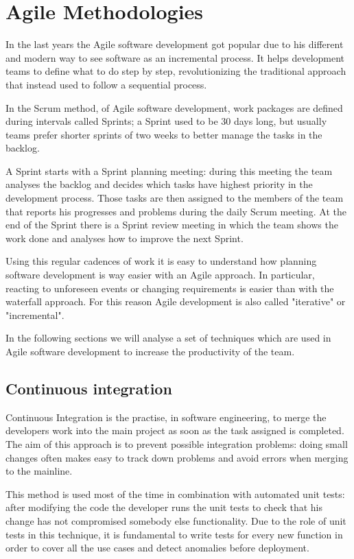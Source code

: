 \section{Agile Methodologies}

In the last years the Agile software development got popular due to his
different and modern way to see software as an incremental process. It
helps development teams to define what to do step by step, revolutionizing
the traditional approach that instead used to follow a sequential process.

In the Scrum method, of Agile software development, work packages are
defined during intervals called Sprints; a Sprint used to be 30 days long,
but usually teams prefer shorter sprints of two weeks to better manage the
tasks in the backlog.

A Sprint starts with a Sprint planning meeting: during this meeting the team
analyses the backlog and decides which tasks have highest priority in the
development process. Those tasks are then assigned to the members of the
team that reports his progresses and problems during the daily Scrum
meeting. At the end of the Sprint there is a Sprint review meeting in
which the team shows the work done and analyses how to improve the next
Sprint.

Using this regular cadences of work it is easy to understand how planning
software development is way easier with an Agile approach. In particular,
reacting to unforeseen events or changing requirements is easier than with
the waterfall approach. For this reason Agile development is also called
"iterative" or "incremental".

In the following sections we will analyse a set of techniques which are
used in Agile software development to increase the productivity of the
team.

\subsection{Continuous integration}

Continuous Integration is the practise, in software engineering, to merge
the developers work into the main project as soon as the task assigned is
completed. The aim of this approach is to prevent possible integration
problems: doing small changes often makes easy to track down problems and
avoid errors when merging to the mainline.

This method is used most of the time in combination with automated unit tests:
after modifying the code the developer runs the unit tests to check that
his change has not compromised somebody else functionality. Due to the
role of unit tests in this technique, it is fundamental to write tests for
every new function in order to cover all the use cases and detect
anomalies before deployment.

